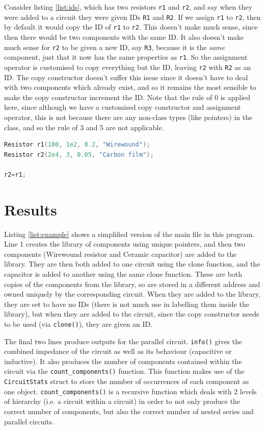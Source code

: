 \documentclass[11pt, letterpaper]{article}
\begin{document}
Consider listing \ref{list:ids}, which has two resistors \verb|r1| and \verb|r2|, and say when they were added to a circuit they were given IDs \verb|R1| and \verb|R2|. If we assign \verb|r1| to \verb|r2|, then by default it would copy the ID of \verb|r1| to \verb|r2|. This doesn't make much sense, since then there would be two components with the same ID. It also doesn't make much sense for \verb|r2| to be given a new ID, say \verb|R3|, because it is the \textit{same} component, just that it now has the same properties as \verb|r1|. So the assignment operator is customised to copy everything but the ID, leaving \verb|r2| with \verb|R2| as an ID. The copy constructor doesn't suffer this issue since it doesn't have to deal with two components which already exist, and so it remains the most sensible to make the copy constructor increment the ID. Note that the rule of 0 is applied here, since although we have a customised copy constructor and assignment operator, this is not because there are any non-class types (like pointers) in the class, and so the rule of 3 and 5 are not applicable.

\begin{lstlisting}[language=C++, caption=Using assignment operator for components, label=list:ids]
Resistor r1(100, 1e2, 0.2, "Wirewound");
Resistor r2(2e4, 3, 0.05, "Carbon film");

r2=r1;
\end{lstlisting}

\section{Results}

Listing \ref{list:example} shows a simplified version of the main file in this program. Line 1 creates the library of components using unique pointers, and then two components (Wirewound resistor and Ceramic capacitor) are added to the library. They are then both added to one circuit using the clone function, and the capacitor is added to another using the same clone function. These are both copies of the components from the library, so are stored in a different address and owned uniquely by the corresponding circuit. When they are added to the library, they are set to have no IDs (there is not much use in labelling them inside the library), but when they are added to the circuit, since the copy constructor needs to be used (via \verb|clone()|), they are given an ID. 

The final two lines produce outputs for the parallel circuit. \verb|info()| gives the combined impedance of the circuit as well as its behaviour (capacitive or inductive). It also produces the number of components contained within the circuit via the \verb|count_components()| function. This function makes use of the \verb|CircuitStats| struct to store the number of occurrences of each component as one object. \verb|count_components()| is a recursive function which deals with 2 levels of hierarchy (i.e. a circuit within a circuit) in order to not only produce the correct number of components, but also the correct number of nested series and parallel circuits.
\end{document}
